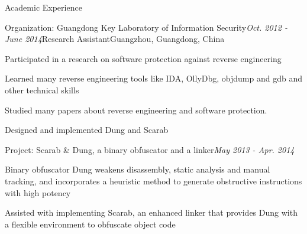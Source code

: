 \documentclass{resume} %
\begin{document}
\begin{rSection}{Academic Experience}

\begin{rSubsection}{Organization: Guangdong Key Laboratory of Information Security}{\em Oct. 2012 - June 2014}{Research Assistant}{Guangzhou, Guangdong, China}
\item Participated in a research on software protection against reverse engineering
\item Learned many reverse engineering tools like IDA, OllyDbg, objdump and gdb and other technical skills
\item Studied many papers about reverse engineering and software protection.
\item Designed and implemented Dung and Scarab
\end{rSubsection}


\begin{rSubsection}{Project: Scarab \& Dung, a binary obfuscator and a linker}{\em May 2013 - Apr. 2014}{}{}
\item Binary obfuscator Dung weakens disassembly, static analysis and manual tracking, and incorporates a heuristic method to generate obstructive instructions with high potency
\item Assisted with implementing Scarab, an enhanced linker that provides Dung with a flexible environment to obfuscate object code
\end{rSubsection}

\end{rSection}


\end{document}
